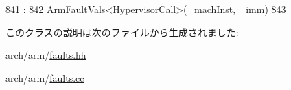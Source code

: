 \begin{DoxyCode}
841                                                                    :
842         ArmFaultVals<HypervisorCall>(_machInst, _imm)
843 {}

\end{DoxyCode}


このクラスの説明は次のファイルから生成されました:\begin{DoxyCompactItemize}
\item 
arch/arm/\hyperlink{arch_2arm_2faults_8hh}{faults.hh}\item 
arch/arm/\hyperlink{arch_2arm_2faults_8cc}{faults.cc}\end{DoxyCompactItemize}
